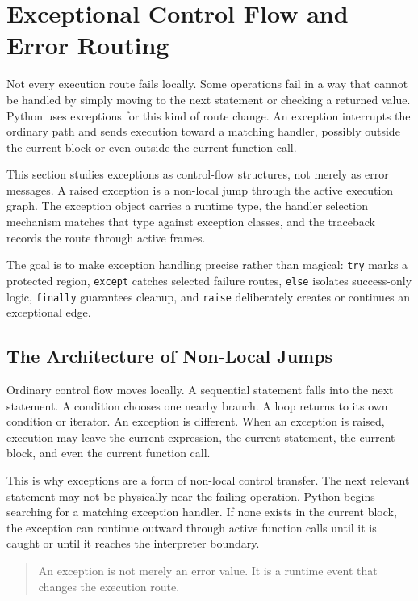 \documentclass[a4paper,twoside]{report}
\begin{document}
\section{Exceptional Control Flow and Error Routing}

Not every execution route fails locally. Some operations fail in a way that cannot be handled by simply moving to the next statement or checking a returned value. Python uses exceptions for this kind of route change. An exception interrupts the ordinary path and sends execution toward a matching handler, possibly outside the current block or even outside the current function call.

This section studies exceptions as control-flow structures, not merely as error messages. A raised exception is a non-local jump through the active execution graph. The exception object carries a runtime type, the handler selection mechanism matches that type against exception classes, and the traceback records the route through active frames.

The goal is to make exception handling precise rather than magical: \texttt{try} marks a protected region, \texttt{except} catches selected failure routes, \texttt{else} isolates success-only logic, \texttt{finally} guarantees cleanup, and \texttt{raise} deliberately creates or continues an exceptional edge.

\subsection{The Architecture of Non-Local Jumps}

Ordinary control flow moves locally. A sequential statement falls into the next statement. A condition chooses one nearby branch. A loop returns to its own condition or iterator. An exception is different. When an exception is raised, execution may leave the current expression, the current statement, the current block, and even the current function call.

This is why exceptions are a form of non-local control transfer. The next relevant statement may not be physically near the failing operation. Python begins searching for a matching exception handler. If none exists in the current block, the exception can continue outward through active function calls until it is caught or until it reaches the interpreter boundary.

\begin{quote}
An exception is not merely an error value. It is a runtime event that changes the execution route.
\end{quote}
\end{document}
